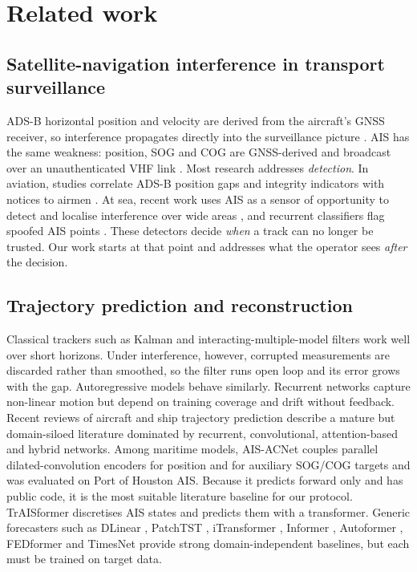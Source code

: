\section{Related work}
\label{sec:related}

\subsection{Satellite-navigation interference in transport surveillance}

ADS-B horizontal position and velocity are derived from the aircraft's GNSS
receiver, so interference propagates directly into the surveillance picture
\citep{khan2025adsbsurvey,pik2024detecting,pik2025gps}. AIS has the same
weakness: position, SOG and COG are GNSS-derived and broadcast over an
unauthenticated VHF link \citep{itu2014ais}. Most research addresses
\emph{detection}. In aviation, studies correlate ADS-B position gaps and
integrity indicators with notices to airmen \citep{pik2024detecting}. At
sea, recent work uses AIS as a sensor of opportunity to detect and localise
interference over wide areas \citep{park2026aisbased,winkel2026seaspoof},
and recurrent classifiers flag spoofed AIS points \citep{raj2025vessel}.
These detectors decide \emph{when} a track can no longer be trusted. Our
work starts at that point and addresses what the operator sees
\emph{after} the decision.

\subsection{Trajectory prediction and reconstruction}

Classical trackers such as Kalman and interacting-multiple-model filters
\citep{kalman1960new,ren2024improved} work well over short horizons. Under
interference, however, corrupted measurements are discarded rather than
smoothed, so the filter runs open loop and its error grows with the gap.
Autoregressive models behave similarly. Recurrent networks
\citep{pang2019lstm,hashemi2024bidirectional} capture non-linear motion but
depend on training coverage and drift without feedback. Recent reviews of
aircraft \citep{kwak2025evolution} and ship trajectory prediction
\citep{li2023ship,guo2026systematic} describe a mature but domain-siloed
literature dominated by recurrent, convolutional, attention-based and hybrid
networks. Among maritime models, AIS-ACNet \citep{shin2024aisacnet} couples
parallel dilated-convolution encoders for position and for auxiliary SOG/COG
targets and was evaluated on Port of Houston AIS. Because it predicts
forward only and has public code, it is the most suitable literature
baseline for our protocol. TrAISformer \citep{nguyen2024transformer}
discretises AIS states and predicts them with a transformer. Generic
forecasters such as DLinear \citep{zeng2023transformers}, PatchTST
\citep{nie2023timeseries}, iTransformer \citep{liu2024itransformer}, Informer
\citep{zhou2021informer}, Autoformer \citep{wu2021autoformer}, FEDformer
\citep{zhou2022fedformer} and TimesNet \citep{wu2023timesnet} provide strong
domain-independent baselines, but each must be trained on target data.

